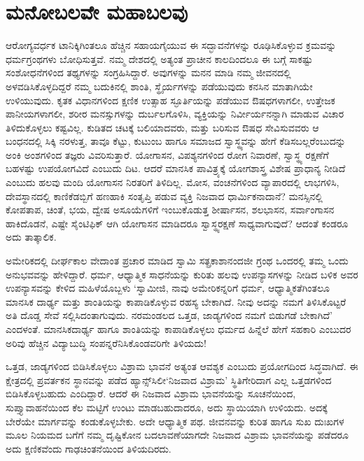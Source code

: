 \section*{ಮನೋಬಲವೇ ಮಹಾಬಲವು}


ಆರೋಗ್ಯವರ್ಧಕ ಟಾನಿಕ್ಕಿಗಿಂತಲೂ ಹೆಚ್ಚಿನ ಸಹಾಯಗೈಯುವ ಈ ಸದ್ಭಾವನೆಗಳನ್ನು ರೂಢಿಸಿ\-ಕೊಳ್ಳುವ ಕ್ರಮವನ್ನು ಧರ್ಮಗ್ರಂಥಗಳು ಬೋಧಿಸುತ್ತವೆ. ನಮ್ಮ ದೇಶದಲ್ಲಿ ಅತ್ಯಂತ ಪ್ರಾಚೀನ ಕಾಲದಿಂದಲೂ ಈ ಬಗ್ಗೆ ಸಾಕಷ್ಟು ಸಂಶೋಧನೆಗಳಿಂದ ತಥ್ಯಗಳನ್ನು ಸಂಗ್ರಹಿಸಿದ್ದಾರೆ. ಅವುಗಳನ್ನು ಮನನ ಮಾಡಿ ನಮ್ಮ ಜೀವನದಲ್ಲಿ ಅಳವಡಿಸಿಕೊಳ್ಳದಿದ್ದರೆ ನಮ್ಮ ಬದುಕಿನಲ್ಲಿ ಶಾಂತಿ, ಸ್ಥೈರ್ಯಗಳನ್ನು ಪಡೆಯುವುದು ಕನಸಿನ ಮಾತಾಗಿಯೇ ಉಳಿಯುವುದು. ಕೃತಕ ವಿಧಾನಗಳಿಂದ ಕ್ಷಣಿಕ ಉತ್ಸಾಹ ಸ್ಫೂರ್ತಿಯನ್ನು ಪಡೆಯುವ ಔಷಧಗಳಾಗಲೀ, ಉತ್ತೇಜಕ ಪಾನೀಯಗಳಾಗಲೀ, ಶರೀರ ಮನಸ್ಸುಗಳನ್ನು ದುರ್ಬಲಗೊಳಿಸಿ, ವ್ಯಕ್ತಿಯನ್ನು ನಿರ್ವೀರ್ಯನನ್ನಾಗಿ ಮಾಡುವ ವಿಚಾರ ತಿಳಿದುಕೊಳ್ಳಲು ಕಷ್ಟವಿಲ್ಲ. ಕುಡಿತದ ಚಟಕ್ಕೆ ಬಲಿಯಾದವರು, ಮತ್ತು ಬರಿಸುವ ಔಷಧ ಸೇವಿಸು\-ವವರು ಆ ಬಂಧನದಲ್ಲಿ ಸಿಕ್ಕಿ ನರಳುತ್ತ, ತಾವೂ ಕೆಟ್ಟು, ಕುಟುಂಬ ಹಾಗೂ ಸಮಾಜದ ಸ್ವಾಸ್ಥ್ಯವನ್ನು ಹೇಗೆ ಕೆಡಿಸಬಲ್ಲರೆಂಬುದನ್ನು ಅಂಕಿ ಅಂಶಗಳಿಂದ ತಜ್ಞರು ವಿವರಿಸುತ್ತಾರೆ. ಯೋಗಾಸನ, ವಿಪಶ್ಯನಗಳಿಂದ ರೋಗ ನಿವಾರಣೆ, ಸ್ವಾಸ್ಥ್ಯ ರಕ್ಷಣೆಗೆ ಬಹಳಷ್ಟು ಉಪಯೋಗವಿದೆ ಎಂಬುದು ದಿಟ. ಆದರೆ ಮಾನಸಿಕ ಪಾವಿತ್ರ್ಯಕ್ಕೆ ಯೋಗಶಾಸ್ತ್ರ ವಿಶೇಷ ಪ್ರಾಧಾನ್ಯ ನೀಡಿದೆ ಎಂಬುದು ಹಲವು ಮಂದಿ ಯೋಗಾಸನ ನಿರತರಿಗೆ ತಿಳಿದಿಲ್ಲ. ಮೋಸ, ವಂಚನೆಗಳಿಂದ ವ್ಯಾಪಾರದಲ್ಲಿ ಲಾಭಗಳಿಸಿ, ದೇವಸ್ಥಾನದಲ್ಲಿ ಕಾಣಿಕೆಡಬ್ಬಿಗೆ ಹಣಹಾಕಿ ಸಂತೃಪ್ತಿ ಪಡುವ ವ್ಯಕ್ತಿ ನಿಜವಾದ ಧಾರ್ಮಿಕನಾದಾನೆ? ಮನಸ್ಸಿನಲ್ಲಿ ಕೋಪತಾಪ, ಚಿಂತೆ, ಭಯ, ದ್ವೇಷ ಅಸೂಯೆಗಳಿಗೆ ಇಂಬುಕೊಡುತ್ತ ಶೀರ್ಷಾಸನ, ಶಲಭಾಸನ, ಸರ್ವಾಂಗಾಸನ ಹಾಕಿದೊಡನೆ, ಎಷ್ಟೇ ಸೈಂಟಿಫಿಕ್ ಆಗಿ ಯೋಗಾಸನ ಮಾಡಿದರೂ ಸ್ವಾಸ್ಥ್ಯರಕ್ಷಣೆ ಸಾಧ್ಯವಾಗುವುದೆ? ಆದಂತೆ ಕಂಡರೂ ಅದು ತಾತ್ಕಾಲಿಕ.

ಅಮೇರಿಕದಲ್ಲಿ ದೀರ್ಘಕಾಲ ವೇದಾಂತ ಪ್ರಚಾರ ಮಾಡಿದ ಸ್ವಾಮಿ ಸತ್ಪ್ರಕಾಶಾನಂದಜೀ ಗ್ರಂಥ ಒಂದರಲ್ಲಿ ತಮ್ಮ ಒಂದು ಅನುಭವವನ್ನು ಹೇಳಿದ್ದಾರೆ. ಧರ್ಮ, ಆಧ್ಯಾತ್ಮಿಕ ಸಾಧನೆಯನ್ನು ಕುರಿತು ಹಲವು ಉಪನ್ಯಾಸಗಳನ್ನು ನೀಡಿದ ಬಳಿಕ ಅವರ ಉಪನ್ಯಾಸವನ್ನು ಕೇಳಿದ ಮಹಿಳೆಯೊಬ್ಬಳು ‘ಸ್ವಾಮೀಜಿ, ನಾವು ಅಮೇರಿಕನ್ನರಿಗೆ ಧರ್ಮ, ಆಧ್ಯಾತ್ಮಿಕತೆಗಿಂತಲೂ ಮಾನಸಿಕ ದಾರ್ಢ್ಯ ಮತ್ತು ಶಾಂತಿಯನ್ನು ಕಾಪಾಡಿಕೊಳ್ಳುವ ರಹಸ್ಯ ಬೇಕಾಗಿದೆ. ನೀವು ಅದನ್ನು ನಮಗೆ ತಿಳಿಸಿಕೊಟ್ಟರೆ ಅತಿ ದೊಡ್ಡ ಸೇವೆ ಸಲ್ಲಿಸಿದಂತಾಗುವುದು. ನರಮಂಡಲದ ಒತ್ತಡ, ಜಾಡ್ಯಗಳಿಂದ ನಮಗೆ ಬಿಡುಗಡೆ ಬೇಕಾಗಿದೆ’ ಎಂದಳಂತೆ. ಮಾನಸಿಕದಾರ್ಢ್ಯ ಹಾಗೂ ಶಾಂತಿಯನ್ನು ಕಾಪಾಡಿಕೊಳ್ಳಲು ಧರ್ಮದ ಹಿನ್ನೆಲೆ ಹೇಗೆ ಸಹಕಾರಿ ಎಂಬುದರ ಅರಿವು ಹೆಚ್ಚಿನ ವಿದ್ಯಾಬುದ್ಧಿ ಸಂಪನ್ನರೆನಿಸಿಕೊಂಡವರಿಗೇ ತಿಳಿಯದು!

ಒತ್ತಡ, ಜಾಡ್ಯಗಳಿಂದ ಬಿಡಿಸಿಕೊಳ್ಳಲು ವಿಶ್ರಾಮ ಭಾವನೆ ಅತ್ಯಂತ ಆವಶ್ಯಕ ಎಂಬುದು ಪ್ರಯೋಗದಿಂದ ಸಿದ್ಧವಾಗಿದೆ. ಈ ಕ್ಷೇತ್ರದಲ್ಲಿ ಪ್ರವರ್ತಕನ ಸ್ಥಾನವನ್ನು ಪಡೆದ ಹ್ಯಾನ್ಸ್​ಸಿಲೀ\break ‘ನಿಜವಾದ ವಿಶ್ರಾಮ’ ಸ್ಥಿತಿಗೇರಿದಾಗ ಎಲ್ಲ ಒತ್ತಡಗಳಿಂದ ಬಿಡಿಸಿಕೊಳ್ಳಬಹುದು ಎಂದಿದ್ದಾರೆ. ಆದರೆ ಈ ನಿಜವಾದ ವಿಶ್ರಾಮ ಭಾವನೆಯನ್ನು ಸೂಚನೆಯಿಂದ, ಸುಪ್ತ್ಯಾವಾಹನೆಯಿಂದ ಕೆಲ ಮಟ್ಟಿಗೆ ಉಂಟು ಮಾಡಬಹುದಾದರೂ, ಅದು ಸ್ಥಾಯಿಯಾಗಿ ಉಳಿಯದು. ಅದಕ್ಕೆ ಬೇರೆಯೇ ಮಾರ್ಗವನ್ನು ಕಂಡುಕೊಳ್ಳಬೇಕು. ಅದೇ ಆಧ್ಯಾತ್ಮಿಕ ಪಥ. ಜೀವನವನ್ನು ಕುರಿತ ಹಾಗೂ ಸುಖ ದುಃಖಗಳ ಮೂಲ ನಿಯಮದ ಬಗೆಗೆ ನಮ್ಮ ದೃಷ್ಟಿಕೋನ ಬದಲಾವಣೆಯಾಗದೇ ನಿಜವಾದ ವಿಶ್ರಾಮ ಭಾವನೆಯನ್ನು ಪಡೆದರೂ ಅದು ಕ್ಷಣಿಕವೆಂದು ಗಾಢಚಿಂತನೆಯಿಂದ ತಿಳಿಯದಿರದು.

